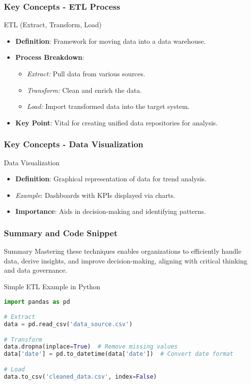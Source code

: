 \documentclass[aspectratio=169]{beamer}
\begin{document}
\begin{frame}[fragile]
    \frametitle{Key Concepts - ETL Process}
    \begin{block}{ETL (Extract, Transform, Load)}
        \begin{itemize}
            \item \textbf{Definition}: Framework for moving data into a data warehouse.
            \item \textbf{Process Breakdown}:
              \begin{itemize}
                  \item \textit{Extract:} Pull data from various sources.
                  \item \textit{Transform:} Clean and enrich the data.
                  \item \textit{Load:} Import transformed data into the target system.
              \end{itemize}
            \item \textbf{Key Point}: Vital for creating unified data repositories for analysis.
        \end{itemize}
    \end{block}
\end{frame}

\begin{frame}[fragile]
    \frametitle{Key Concepts - Data Visualization}
    \begin{block}{Data Visualization}
        \begin{itemize}
            \item \textbf{Definition}: Graphical representation of data for trend analysis.
            \item \textit{Example}: Dashboards with KPIs displayed via charts.
            \item \textbf{Importance}: Aids in decision-making and identifying patterns.
        \end{itemize}
    \end{block}
\end{frame}

\begin{frame}[fragile]
    \frametitle{Summary and Code Snippet}
    \begin{block}{Summary}
        Mastering these techniques enables organizations to efficiently handle data, derive insights, and improve decision-making, aligning with critical thinking and data governance.
    \end{block}
    \begin{block}{Simple ETL Example in Python}
        \begin{lstlisting}[language=Python]
import pandas as pd

# Extract
data = pd.read_csv('data_source.csv')

# Transform
data.dropna(inplace=True)  # Remove missing values
data['date'] = pd.to_datetime(data['date'])  # Convert date format

# Load
data.to_csv('cleaned_data.csv', index=False)
        \end{lstlisting}
    \end{block}
\end{frame}
\end{document}
